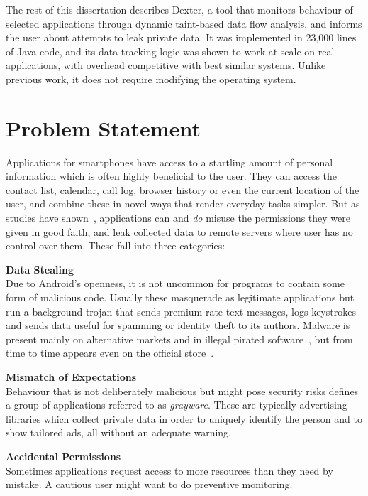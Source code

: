 \documentclass[12pt,twoside,notitlepage]{report}
\begin{document}
The rest of this dissertation describes Dexter, a tool that monitors behaviour of selected applications through dynamic taint-based data flow analysis, and informs the user about attempts to leak private data. It was implemented in 23,000 lines of Java code, and its data-tracking logic was shown to work at scale on real applications, with overhead competitive with best similar systems. Unlike previous work, it does not require modifying the operating system.

\section{Problem Statement}

Applications for smartphones have access to a startling amount of personal information which is often highly beneficial to the user. They can access the contact list, calendar, call log, browser history or even the current location of the user, and combine these in novel ways that render everyday tasks simpler. But as studies have shown~\cite{web:Appthority, web:HuffingtonOneInThree}, applications can and \emph{do} misuse the permissions they were given in good faith, and leak collected data to remote servers where user has no control over them. These fall into three categories:
\begin{description}
\item \textbf{Data Stealing} \\
Due to Android's openness, it is not uncommon for programs to contain some form of malicious code. Usually these masquerade as legitimate applications but run a background trojan that sends premium-rate text messages, logs keystrokes and sends data useful for spamming or identity theft to its authors. Malware is present mainly on alternative markets and in illegal pirated software~\cite{Zhou:2012:DRS:2133601.2133640}, but from time to time appears even on the official store~\cite{web:LookoutPlayRemoval}.

\item \textbf{Mismatch of Expectations} \\
Behaviour that is not deliberately malicious but might pose security risks defines a group of applications referred to as \emph{grayware}. These are typically advertising libraries which collect private data in order to uniquely identify the person and to show tailored ads, all without an adequate warning.

\item \textbf{Accidental Permissions} \\
Sometimes applications request access to more resources than they need by mistake. A cautious user might want to do preventive monitoring. 
\end{description}
\end{document}
